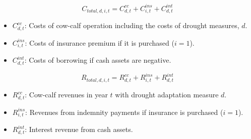 \documentclass[11pt]{article}
\begin{document}
\begin{equation}
C_{total,d,i,t} = C^{cc}_{d,t} + C^{ins}_{i,t} + C^{int}_{d,t}
\end{equation}	
\begin{itemize}
\item $C^{cc}_{d,t}$: Costs of cow-calf operation including the costs of drought measures, $d$.
\item $C^{ins}_{i,t}$: Costs of insurance premium if it is purchased ($i=1$).
\item $C^{int}_{d,t}$: Costs of borrowing if cash assets are negative. 
\end{itemize}

\begin{equation}
R_{total,d,i,t} =R^{cc}_{d,t}+  R^{ins}_{i,t}+ R^{int}_{d,t}
\end{equation}
\begin{itemize}
\item $R^{cc}_{d,t}$: Cow-calf revenues in year $t$ with drought adaptation measure $d$.
\item $R^{ins}_{i,t}$: Revenues from indemnity payments if insurance is purchased ($i=1$).
\item $R^{int}_{d,t}$: Interest revenue from cash assets.
\end{itemize}
\end{document}
